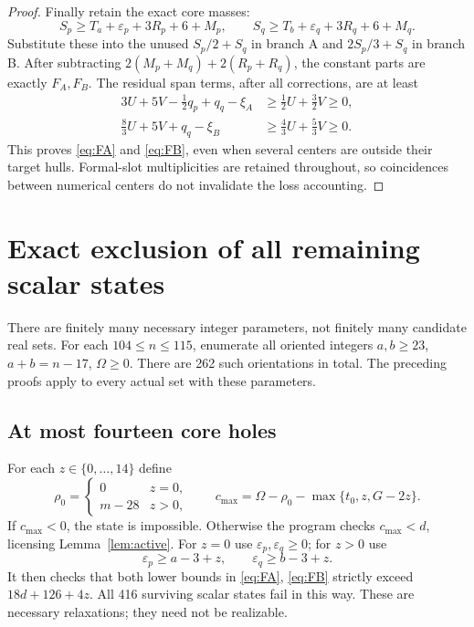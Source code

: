 \documentclass[11pt,a4paper]{article}
\begin{document}
\begin{proof}
Finally retain the exact core masses:
\[
 S_p\ge T_a+\varepsilon_p+3R_p+6+M_p,\qquad
 S_q\ge T_b+\varepsilon_q+3R_q+6+M_q.
\]
Substitute these into the unused $S_p/2+S_q$ in branch A and
$2S_p/3+S_q$ in branch B. After subtracting
$2(M_p+M_q)+2(R_p+R_q)$, the constant parts are exactly $F_A,F_B$.
The residual span terms, after all corrections, are at least
\begin{align*}
 3U+5V-\tfrac12q_p+q_q-\xi_A&\ge\tfrac12U+\tfrac32V\ge0,\\
 \tfrac83U+5V+q_q-\xi_B&\ge\tfrac43U+\tfrac53V\ge0.
\end{align*}
This proves \eqref{eq:FA} and \eqref{eq:FB}, even when several centers
are outside their target hulls. Formal-slot multiplicities are retained
throughout, so coincidences between numerical centers do not invalidate
the loss accounting.
\end{proof}

\section{Exact exclusion of all remaining scalar states}
There are finitely many necessary integer parameters, not finitely many
candidate real sets. For each $104\le n\le115$, enumerate all oriented
integers $a,b\ge23$, $a+b=n-17$, $\Omega\ge0$. There are 262 such
orientations in total. The preceding proofs apply to every actual set
with these parameters.

\subsection{At most fourteen core holes}
For each $z\in\{0,\ldots,14\}$ define
\[
 \rho_0=\begin{cases}0&z=0,\\m-28&z>0,\end{cases}\qquad
 c_{\max}=\Omega-\rho_0-\max\{t_0,z,G-2z\}.
\]
If $c_{\max}<0$, the state is impossible. Otherwise the program checks
$c_{\max}<d$, licensing Lemma~\ref{lem:active}. For $z=0$ use
$\varepsilon_p,\varepsilon_q\ge0$; for $z>0$ use
\[
 \varepsilon_p\ge a-3+z,\qquad\varepsilon_q\ge b-3+z.
\]
It then checks that both lower bounds in \eqref{eq:FA}, \eqref{eq:FB}
strictly exceed $18d+126+4z$. All 416 surviving scalar states fail in
this way. These are necessary relaxations; they need not be realizable.
\end{document}
